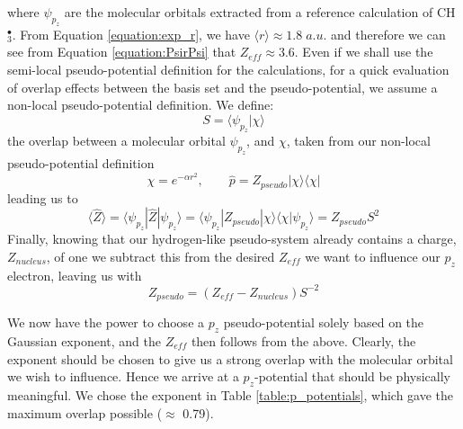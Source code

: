 \documentclass[journal=jctcce,manuscript=article]{achemso}
\begin{document}

 where \(\psi_{p_{z}}\) are the molecular orbitals extracted from a reference calculation of CH\(^{\bullet}_{3}\). From Equation \ref{equation:exp_r}, we have \( \langle r \rangle \approx 1.8\;a.u.\) and therefore we can see from Equation \ref{equation:PsirPsi} that \(Z_{eff} \approx 3.6\). Even if we shall use the semi-local pseudo-potential definition for the calculations, for a quick evaluation of overlap effects between the basis set and the pseudo-potential, we assume a non-local pseudo-potential definition. We define:
\begin{equation}
S = \langle \psi_{p_{z}} | \chi \rangle
\end{equation}
the overlap between a molecular orbital \(\psi_{p_{z}}\), and \(\chi\), taken from our non-local pseudo-potential definition \cite{huzinaga_effective_1991}
\begin{equation}
\chi = e^{-\alpha r^{2}},\qquad \widehat{p} = Z_{pseudo} | \chi \rangle \langle \chi |
\end{equation}
leading us to
\begin{equation}
\langle \widehat{Z} \rangle = \langle \psi_{p_{z}} | \widehat{Z} | \psi_{p_{z}} \rangle = \langle \psi_{p_{z}} | Z_{pseudo} | \chi \rangle \langle \chi | \psi_{p_{z}} \rangle = Z_{pseudo} S^{2}
\end{equation}
Finally, knowing that our hydrogen-like pseudo-system already contains a charge, \(Z_{nucleus}\), of one we subtract this from the desired \(Z_{eff}\) we want to influence our \(p_{z}\) electron, leaving us with
\begin{equation}
Z_{pseudo} = (Z_{eff} - Z_{nucleus})S^{-2}
\end{equation}

We now have the power to choose a \(p_{z}\) pseudo-potential solely based on the Gaussian exponent, and the \(Z_{eff}\) then follows from the above. Clearly, the exponent should be chosen to give us a strong overlap with the molecular orbital we wish to influence. Hence we arrive at a \(p_{z}\)-potential that should be physically meaningful. We chose the exponent in Table \ref{table:p_potentials}, which gave the maximum overlap possible ($\approx$ 0.79).
\end{document}
